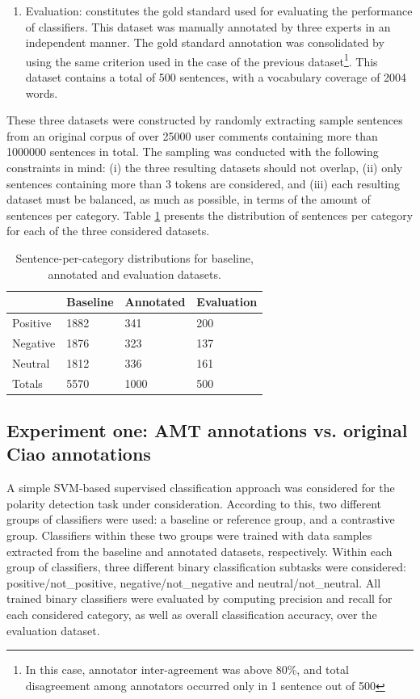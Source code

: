 \documentclass[11pt,letterpaper]{article}
\begin{document}
\begin{enumerate}
\item Evaluation: constitutes the gold standard used for evaluating the performance of classifiers.
This dataset was manually annotated by three experts in an independent manner. The gold standard annotation
was consolidated by using the same criterion used in the case of the previous dataset\footnote{In this case, 
annotator inter-agreement was above 80\%, and total disagreement among annotators occurred only in 1 sentence
out of 500}. This dataset contains a total of 500 sentences, with a vocabulary coverage of 2004 words.    
\end{enumerate} 

These three datasets were constructed by randomly extracting sample sentences from an original corpus
of over 25000 user comments containing more than 1000000 sentences in total. The sampling was conducted 
with the following constraints in mind: (i) the three resulting datasets should not overlap, (ii) only sentences 
containing more than 3 tokens are considered, and (iii) each resulting dataset must be balanced, as much
as possible, in terms of the amount of sentences per category. Table \ref{tc_corpus} presents the
distribution of sentences per category for each of the three considered datasets.  

\begin{table}
\begin{tabular}{|l|l|l|l|}
\hline
&Baseline &Annotated &Evaluation \\
\hline
Positive &1882 &341 &200 \\
\hline
Negative &1876 &323 &137 \\
\hline
Neutral &1812 &336 &161 \\
\hline
Totals &5570 &1000 &500 \\
\hline
\end{tabular}
\caption{Sentence-per-category distributions for baseline, annotated and evaluation datasets.}
\label{tc_corpus}
\end{table}

\subsection{Experiment one: AMT annotations vs. original Ciao annotations}
\label{eval1}
A simple SVM-based supervised classification approach was considered for the
polarity detection task under consideration. According to this, two different groups of classifiers were 
used: a baseline or reference group, and a contrastive group. Classifiers within these two groups were
trained with data samples extracted from the baseline and annotated datasets, respectively. Within each group 
of classifiers, three different binary classification subtasks were considered: positive/not\_positive, 
negative/not\_negative and neutral/not\_neutral. All trained binary classifiers were evaluated by computing 
precision and recall for each considered category, as well as overall classification accuracy, over the 
evaluation dataset.
\end{document}
